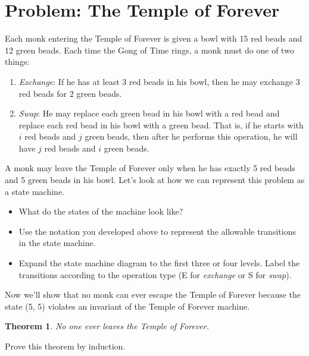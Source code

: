 \documentclass[a4paper]{article}
\newtheorem{theorem}{Theorem}[section]
\begin{document}
	\section{Problem: The Temple of Forever}%
	\label{sec:Problem: The Temple of Forever}

	Each monk entering the Temple of Forever is given a bowl with 15 red
	beads and 12 green beads. Each time the Gong of Time rings, a monk must
	do one of two things:

	\begin{enumerate}
		\item \textit{Exchange}: If he has at least 3 red beads in his bowl, then he may exchange 3 red beads
		for 2 green beads.
		\item \textit{Swap}: He may replace each green bead in his bowl with a red bead and replace each
		red bead in his bowl with a green bead. That is, if he starts with $i$ red beads and
		$j$ green beads, then after he performs this operation, he will have $j$ red beads and $i$
		green beads.
	\end{enumerate}

	A monk may leave the Temple of Forever only when he has exactly 5 red beads and
	5 green beads in his bowl.  Let’s look at how we can represent this problem as
	a state machine.

	\begin{itemize}
		\item What do the states of the machine look like?
		\item Use the notation you developed above to represent the allowable transitions in the
		state machine.
		\item Expand the state machine diagram to the first three or four levels. Label the transitions
		according to the operation type (E for \textit{exchange} or S for \textit{swap}).
	\end{itemize}

	Now we’ll show that no monk can ever escape the Temple of Forever because the state
	(5, 5) violates an invariant of the Temple of Forever machine.

	\begin{theorem}
		No one ever leaves the Temple of Forever.
	\end{theorem}

	Prove this theorem by induction.
\end{document}
